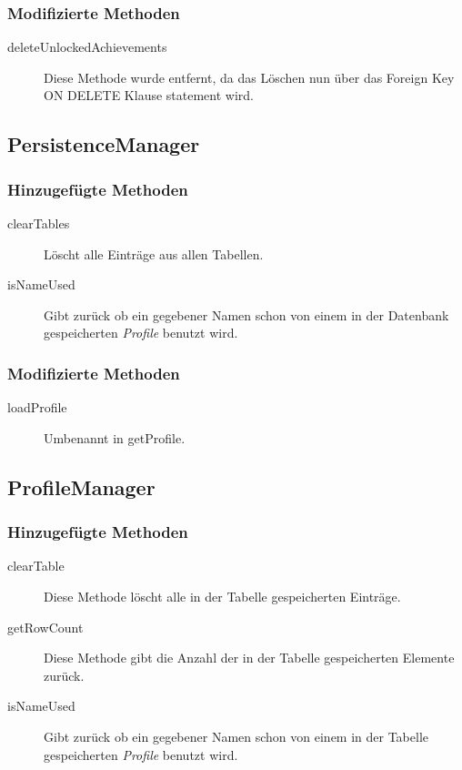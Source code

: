 \subsubsection{Modifizierte Methoden}
\begin{description}
\item[deleteUnlockedAchievements]
Diese Methode wurde entfernt, da das Löschen nun über das Foreign Key ON DELETE Klause statement wird.
\end{description}


\subsection{PersistenceManager}

\subsubsection{Hinzugefügte Methoden}
\begin{description}
\item[clearTables]
Löscht alle Einträge aus allen Tabellen.
\item[isNameUsed]
Gibt zurück ob ein gegebener Namen schon von einem in der Datenbank gespeicherten \emph{Profile} benutzt wird.
\end{description}

\subsubsection{Modifizierte Methoden}
\begin{description}
\item[loadProfile]
Umbenannt in getProfile.
\end{description}


\subsection{ProfileManager}

\subsubsection{Hinzugefügte Methoden}
\begin{description}
\item[clearTable]
Diese Methode löscht alle in der Tabelle gespeicherten Einträge.
\item[getRowCount]
Diese Methode gibt die Anzahl der in der Tabelle gespeicherten Elemente zurück.
\item[isNameUsed]
Gibt zurück ob ein gegebener Namen schon von einem in der Tabelle gespeicherten \emph{Profile} benutzt wird.
\end{description}


